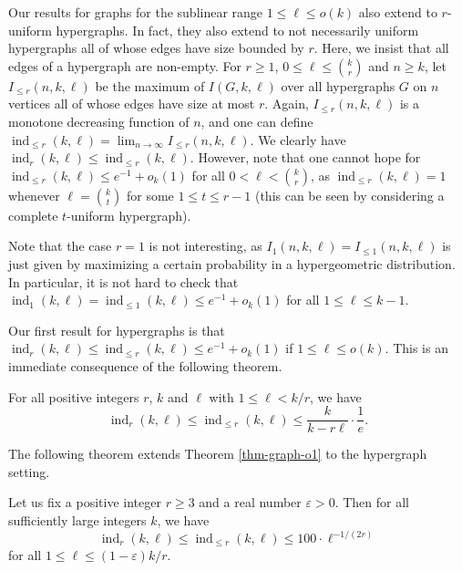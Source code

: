 Our results for graphs for the sublinear range $1\leq \ell\leq o(k)$ also extend to $r$-uniform hypergraphs. In fact, they also extend to not necessarily uniform hypergraphs all of whose edges have size bounded by $r$. Here, we insist that all edges of a hypergraph are non-empty. For $r\geq 1$, $0\leq \ell\leq {k\choose r}$ and $n\geq k$, let $I_{\leq r}(n,k,\ell)$ be the maximum of $I(G,k,\ell)$ over all hypergraphs $G$ on $n$ vertices all of whose edges have size at most $r$. Again, $I_{\leq r}(n,k,\ell)$ is a monotone decreasing function of $n$, and one can define $\operatorname{ind}_{\leq r}(k,\ell)=\lim_{n\to\infty} I_{\leq r}(n,k,\ell)$. We clearly have $\operatorname{ind}_r(k,\ell)\leq \operatorname{ind}_{\leq r}(k,\ell)$. However, note that one cannot hope for $\operatorname{ind}_{\leq r}(k,\ell)\leq e^{-1}+o_k(1)$ for all $0<\ell<{k\choose r}$, as $\operatorname{ind}_{\leq r}(k,\ell)=1$ whenever $\ell={k\choose t}$ for some $1\leq t\leq r-1$ (this can be seen by considering a complete $t$-uniform hypergraph).

Note that the case $r=1$ is not interesting, as $I_1(n,k,\ell)=I_{\leq 1}(n,k,\ell)$ is just given by maximizing a certain probability in a hypergeometric distribution. In particular, it is not hard to check that $\operatorname{ind}_1(k,\ell)= \operatorname{ind}_{\leq 1}(k,\ell)\leq e^{-1}+o_k(1)$ for all $1\leq \ell\leq k-1$.

Our first result for hypergraphs is that $\operatorname{ind}_r(k,\ell)\leq \operatorname{ind}_{\leq r}(k,\ell)\leq e^{-1}+o_k(1)$ if $1\leq \ell\leq o(k)$. This is an immediate consequence of the following theorem.

\begin{theorem}\label{thm-hyper-1-e}For all positive integers $r$, $k$ and $\ell$ with $1\leq \ell< k/r$, we have
\[\operatorname{ind}_r(k,\ell)\leq \operatorname{ind}_{\leq r}(k,\ell)\leq \frac{k}{k-r\ell}\cdot \frac{1}{e}.\]
\end{theorem}

The following theorem extends Theorem \ref{thm-graph-o1} to the hypergraph setting.

\begin{theorem}\label{thm-hyper-o1}Let us fix a positive integer $r\geq 3$ and a real number $\varepsilon>0$. Then for all sufficiently large integers $k$, we have
\[\operatorname{ind}_r(k,\ell)\leq\operatorname{ind}_{\leq r}(k,\ell)\leq 100\cdot \ell^{-1/(2r)}\]
for all $1\leq \ell\leq (1-\varepsilon)k/r$.
\end{theorem}

